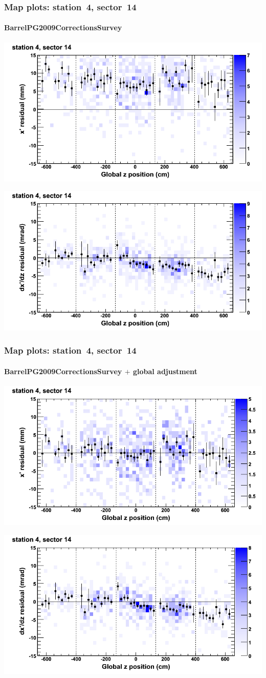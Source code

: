 \documentclass[compress]{beamer}
\begin{document}
\begin{frame}
\frametitle{Map plots: station~4, sector~14}
\framesubtitle{BarrelPG2009CorrectionsSurvey}
\includegraphics[width=0.5\linewidth]{mapplots_01/DTvsz_st4sec14_x.png}

\includegraphics[width=0.5\linewidth]{mapplots_01/DTvsz_st4sec14_dxdz.png}
\end{frame}
\begin{frame}
\frametitle{Map plots: station~4, sector~14}
\framesubtitle{BarrelPG2009CorrectionsSurvey $+$ global adjustment}
\includegraphics[width=0.5\linewidth]{mapplots_re01/DTvsz_st4sec14_x.png}

\includegraphics[width=0.5\linewidth]{mapplots_re01/DTvsz_st4sec14_dxdz.png}
\end{frame}
\end{document}
